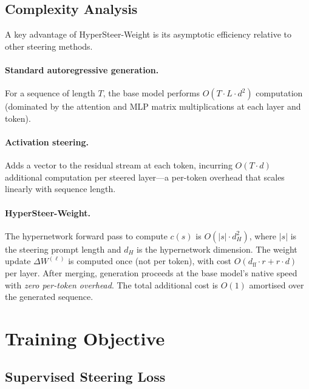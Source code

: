 \subsection{Complexity Analysis}
\label{subsec:complexity}

A key advantage of HyperSteer-Weight is its asymptotic efficiency relative to other steering methods.

\paragraph{Standard autoregressive generation.} For a sequence of length $T$, the base model performs $O(T \cdot L \cdot d^2)$ computation (dominated by the attention and MLP matrix multiplications at each layer and token).

\paragraph{Activation steering.} Adds a vector to the residual stream at each token, incurring $O(T \cdot d)$ additional computation per steered layer---a per-token overhead that scales linearly with sequence length.

\paragraph{HyperSteer-Weight.} The hypernetwork forward pass to compute $c(s)$ is $O(|s| \cdot d_H^2)$, where $|s|$ is the steering prompt length and $d_H$ is the hypernetwork dimension. The weight update $\Delta W^{(\ell)}$ is computed once (not per token), with cost $O(d_{\mathrm{ff}} \cdot r + r \cdot d)$ per layer. After merging, generation proceeds at the base model's native speed with \emph{zero per-token overhead}. The total additional cost is $O(1)$ amortised over the generated sequence.

\section{Training Objective}
\label{sec:training-objective}

\subsection{Supervised Steering Loss}
\label{subsec:steering-loss}

